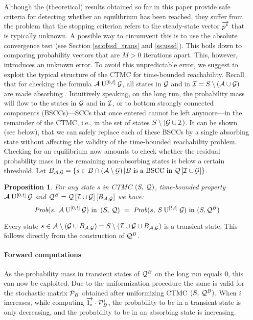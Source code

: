 \documentclass[times, 10pt,twocolumn]{article}
\newtheorem{prop}[theorem]{Proposition}
\begin{document}
	
	Although the (theoretical) results obtained so far in this paper provide safe criteria for detecting whether an equilibrium has been reached, they suffer from the problem that the stopping criterion refers to the steady-state vector $\overrightarrow{p^{*}}$ that is typically unknown.  A possible way to circumvent this is to use the absolute convergence test (see Section \ref{ss:ofssd_trans} and \ref{ss:ussd}).  This boils down to comparing probability vectors that are $M > 0$ iterations apart.  This, however, introduces an unknown error.  To avoid this unpredictable error, we suggest to exploit the typical structure of the CTMC for time-bounded reachability.  Recall that for checking the formula $\mathcal{A} \: \mathrm{U}^{[0,t]} \: \mathcal{G}$, all states in $\mathcal{G}$ and in $\mathcal{I} = S \setminus \left( \mathcal{A} \cup \mathcal{G} \right)$ are made absorbing \cite{BaierHHK_TSE03}.  Intuitively speaking, on the long run, the probability mass will flow to the states in $\mathcal{G}$ and in $\mathcal{I}$, or to bottom strongly connected components (BSCCs)---SCCs that once entered cannot be left anymore---in the remainder of the CTMC, i.e., in the set of states $S \setminus (\mathcal{G} \cup \mathcal{I})$.  It can be shown (see below), that we can safely replace each of these BSCCs by a single absorbing state without affecting the validity of the time-bounded reachability problem.  Checking for an equilibrium now amounts to check whether the residual probability mass in the remaining non-absorbing states is below a certain threshold.
	Let $B_{ \mathcal{A}, \mathcal{G} } = \left\{ s \in B \cap \left( \mathcal{A} \setminus \mathcal{G} \right) | B \text{ is a BSCC in } \mathcal{Q}\left[ \mathcal{I} \cup \mathcal{G} \right] \right\}$.
	\begin{prop}
	For any state $s$ in CTMC $\left( S,\: \mathcal{Q} \right)$, time-bounded property $\mathcal{A} \: \mathrm{U}^{[0,t]} \: \mathcal{G}$ and $\mathcal{Q}^{B} = \mathcal{Q}\left[ \mathcal{I} \cup \mathcal{G} \right] \left[ B_{ \mathcal{A}, \mathcal{G} } \right]$ we have:
		{\small
		\[
			\mbox{\it Prob}(s, \: \mathcal{A} \: \mathrm{U}^{[0,t]} \: \mathcal{G} )\text{ in }\left( S,\: \mathcal{Q} \right) \ = \ \mbox{\it Prob}(s, \: S \: \mathrm{U}^{[t,t]} \: \mathcal{G} )\text{ in }(S,\mathcal{Q}^{B})
		\]
		}
	\end{prop}
	
	Every state $s \in \mathcal{A} \setminus \left( \mathcal{G} \cup B_{ \mathcal{A}, \mathcal{G} } \right) = S \setminus (\mathcal{I} \cup \mathcal{G} \cup B_{ \mathcal{A}, \mathcal{G} })$ is a transient state. This follows directly from the construction of $\mathcal{Q}^{B}$. 
	
	\paragraph{Forward computations}	
	As the probability mass in transient states of $\mathcal{Q}^{B}$ on the long run equals 0, this can now be exploited. Due to the uniformization procedure the same is valid for the stochastic matrix $\mathcal{P}_{B}$ obtained after uniformizing CTMC $(S,\:\mathcal{Q}^{B})$. When $i$ increases, while computing $\overrightarrow{1_{s} } \cdot \mathcal{P}_{B}^{i}$, the probability to be in a transient state is only decreasing, and the probability to be in an absorbing state is increasing.
	
\end{document}
